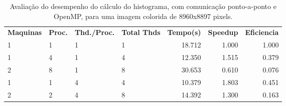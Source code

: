 \documentclass[conference]{IEEEtran}
\begin{document}
\begin{table}[htb!]
  \centering
	\begin{adjustbox}{max width=\linewidth}
	\begin{tabular}{llllrrr}%
		\bfseries Maquinas & \bfseries Proc. & \bfseries Thd./Proc. & \bfseries Total Thds & \bfseries Tempo(s) & \bfseries Speedup & \bfseries Eficiencia \\
    1	& 1	& 1	& 1	& 18.712 & 1.000 & 1.000 \\
    1	& 4	& 1	& 4	& 12.350 & 1.515 & 0.379 \\
    2	& 8	& 1	& 8	& 30.653 & 0.610 & 0.076 \\
    1	& 1	& 4	& 4	& 10.379 & 1.803 & 0.451 \\
    2	& 2	& 4	& 8	& 14.392 & 1.300 & 0.163 \\
	\end{tabular}
	\end{adjustbox}
	\caption{\label{tab:ex04}Avaliação do desempenho do cálculo do histograma, com comunicação ponto-a-ponto e OpenMP, para uma imagem colorida de 8960x8897 pixels.}
\end{table}



%
\end{document}
